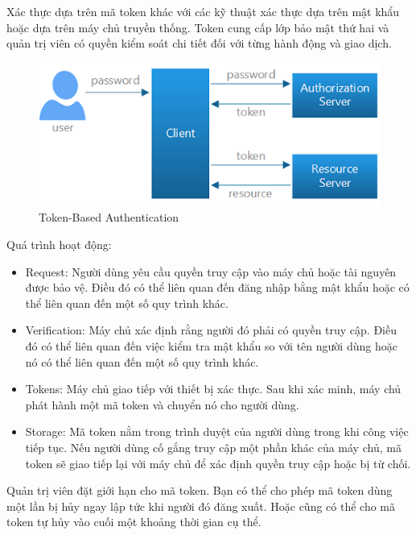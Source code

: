 Xác thực dựa trên mã token khác với các kỹ thuật xác thực dựa trên mật khẩu hoặc dựa trên máy chủ truyền thống. Token cung cấp lớp bảo mật thứ hai và quản trị viên có quyền kiểm soát chi tiết đối với từng hành động và giao dịch.\par

\begin{figure}[H]
    \begin{center}
        \includegraphics[width=12cm]{Image/Technical/token_auth.png}
        \caption{Token-Based Authentication}
        \label{TokenAuth}
    \end{center}
\end{figure}

Quá trình hoạt động:
\begin{itemize}
    \item Request: Người dùng yêu cầu quyền truy cập vào máy chủ hoặc tài nguyên được bảo vệ. Điều đó có thể liên quan đến đăng nhập bằng mật khẩu hoặc có thể liên quan đến một số quy trình khác.
    \item Verification: Máy chủ xác định rằng người đó phải có quyền truy cập. Điều đó có thể liên quan đến việc kiểm tra mật khẩu so với tên người dùng hoặc nó có thể liên quan đến một số quy trình khác.
    \item Tokens: Máy chủ giao tiếp với thiết bị xác thực. Sau khi xác minh, máy chủ phát hành một mã token và chuyển nó cho người dùng.
    \item Storage: Mã token nằm trong trình duyệt của người dùng trong khi công việc tiếp tục. Nếu người dùng cố gắng truy cập một phần khác của máy chủ, mã token sẽ giao tiếp lại với máy chủ để xác định quyền truy cập hoặc bị từ chối.
\end{itemize}
Quản trị viên đặt giới hạn cho mã token. Bạn có thể cho phép mã token dùng một lần bị hủy ngay lập tức khi người đó đăng xuất. Hoặc cũng có thể cho mã token tự hủy vào cuối một khoảng thời gian cụ thể.